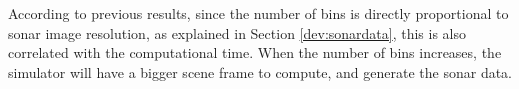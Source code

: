 \documentclass[final,5p,times]{elsarticle}
\begin{document}
According to previous results, since the number of bins is directly
proportional to sonar image resolution, as explained in Section
\ref{dev:sonardata}, this is also correlated with the computational time.
When the number of bins increases, the simulator will have a bigger scene
frame to compute, and generate the sonar data.

%
\end{document}
